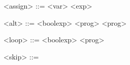 \begin{grammarEx}
	<assign> ::= <var> \lit{=} <exp>
	
	<alt> ::=  <bool\textunderscore exp>  <prog>  <prog> 
	
	<loop> ::=  <bool\textunderscore exp>  <prog> 
	
	<skip> ::= 
\end{grammarEx}